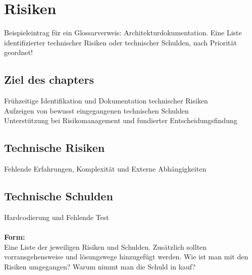 \chapter{Risiken}

Beispieleintrag für ein Glossarverweis: \gls{Architekturdokumentation}.
Eine Liste identifizierter technischer Risiken oder technischer Schulden, nach Priorität geordnet!
\\
\section{Ziel des chapters}
Frühzeitige Identifikation und Dokumentation technischer Risiken\\
Aufzeigen von bewusst eingegangenen technischen Schulden\\
Unterstützung bei Risikomanagement und fundierter Entscheidungsfindung\\

\section{Technische Risiken}
Fehlende Erfahrungen, Komplexität und Externe Abhängigkeiten



\section{Technische Schulden}
Hardcodierung und Fehlende Test\\\\
\textbf{Form:}\\
Eine Liste der jeweiligen Risiken und Schulden. 
Zusätzlich sollten vorransgehensweise und lösungswege hinzugefügt werden.
Wie ist man mit den Risiken umgegangen?
Warum nimmt man die Schuld in kauf?
